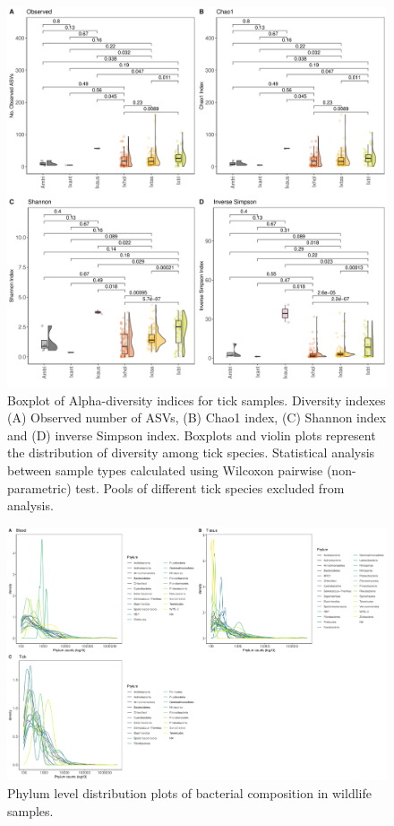 \documentclass[a4paper, nobind]{templates/ociamthesis}
\begin{document}
\begin{figure}
\includegraphics[width=0.95\linewidth]{figures/ms-figs-appendix/FigA-3.3} \caption[Alpha diversity of microbiome community for tick samples]{Boxplot of Alpha-diversity indices for tick samples. Diversity indexes (A) Observed number of ASVs, (B) Chao1 index, (C) Shannon index and (D) inverse Simpson index. Boxplots and violin plots represent the distribution of diversity among tick species. Statistical analysis between sample types calculated using Wilcoxon pairwise (non-parametric) test. Pools of different tick species excluded from analysis.}\label{fig:FA33}
\end{figure}

\newpage

\begin{figure}
\includegraphics[width=0.95\linewidth]{figures/ms-figs-appendix/FigA-3.4} \caption[Phylum level distribution plots]{Phylum level distribution plots of bacterial composition in wildlife samples.}\label{fig:FA34}
\end{figure}
\end{document}

